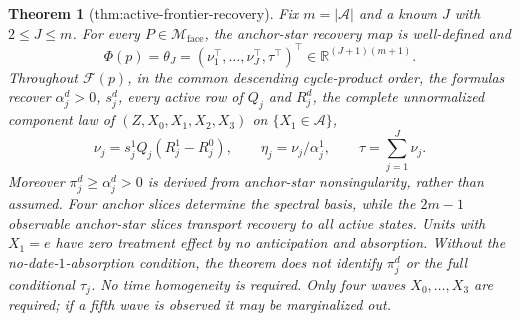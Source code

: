\documentclass{article}
\newtheorem{theorem}{Theorem}
\begin{document}
\begin{theorem}[thm:active-frontier-recovery]\label{thm:active-frontier-recovery}
Fix \(m=|\mathcal A|\) and a known \(J\) with \(2\leq J\leq m\). For every \(P\in\mathcal M_{\mathrm{face}}\), the anchor-star recovery map is well-defined and
\[
 \Phi(p)=\theta_J=(\nu_1^\top,\ldots,\nu_J^\top,\tau^\top)^\top
 \in\mathbb R^{(J+1)(m+1)}.
\]
Throughout \(\mathcal F(p)\), in the common descending cycle-product order, the formulas recover \(\alpha_j^d>0\), \(s_j^d\), every active row of \(Q_j\) and \(R_j^d\), the complete unnormalized component law of \((Z,X_0,X_1,X_2,X_3)\) on \(\{X_1\in\mathcal A\}\),
\[
 \nu_j=s_j^1Q_j(R_j^1-R_j^0),\qquad
 \eta_j=\nu_j/\alpha_j^1,
 \qquad \tau=\sum_{j=1}^J\nu_j.
\]
Moreover \(\pi_j^d\geq\alpha_j^d>0\) is derived from anchor-star nonsingularity, rather than assumed. Four anchor slices determine the spectral basis, while the \(2m-1\) observable anchor-star slices transport recovery to all active states. Units with \(X_1=e\) have zero treatment effect by no anticipation and absorption. Without the no-date-\(1\)-absorption condition, the theorem does not identify \(\pi_j^d\) or the full conditional \(\tau_j\). No time homogeneity is required. Only four waves \(X_0,\ldots,X_3\) are required; if a fifth wave is observed it may be marginalized out.
\end{theorem}
\end{document}

